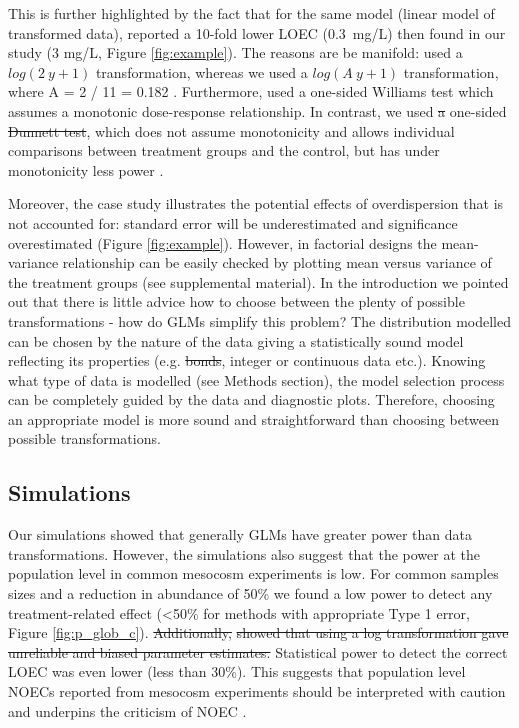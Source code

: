 \documentclass[twocolumn, natbib]{svjour3}
\providecommand{\DIFadd}[1]{{\protect\color{blue}\uwave{#1}}} %
\providecommand{\DIFdel}[1]{{\protect\color{red}\sout{#1}}}                      %
\providecommand{\DIFaddbegin}{} %
\providecommand{\DIFaddend}{} %
\providecommand{\DIFdelbegin}{} %
\providecommand{\DIFdelend}{} %
\begin{document}
\DIFaddend This is further highlighted by the fact that for the same model (linear model of transformed data), \citet{brock_minimum_2015} reported a 10-fold lower LOEC (\mbox{0.3 mg/L}) then found in our study (3 mg/L, Figure \ref{fig:example}).
The reasons are be manifold: \citep{brock_minimum_2015} used a $log(2~y + 1)$ transformation, whereas we used a $log(A~y + 1)$ transformation, where A = 2 / 11 = 0.182 \citep{van_den_brink_impact_2000}.
Furthermore, \citet{brock_minimum_2015} used a one-sided Williams test which assumes a monotonic dose-response relationship.
In contrast, we used \DIFdelbegin \DIFdel{a }\DIFdelend one-sided \DIFdelbegin \DIFdel{Dunnett test}\DIFdelend \DIFaddbegin \DIFadd{comparisons to the control (Dunnett contrasts)}\DIFaddend , which does not assume monotonicity and allows individual comparisons between treatment groups and the control, but has under monotonicity less power \citep{jaki_statistical_2013}.


Moreover, the case study illustrates the potential effects of overdispersion that is not accounted for: standard error will be underestimated and significance overestimated (Figure \ref{fig:example}).
However, in factorial designs the mean-variance relationship can be easily checked by plotting mean versus variance of the treatment groups (see supplemental material).
In the introduction we pointed out that there is little advice how to choose between the plenty of possible transformations - how do GLMs simplify this problem?
The distribution modelled can be chosen by the nature of the data giving a statistically sound model reflecting its properties (e.g. \DIFdelbegin \DIFdel{bonds}\DIFdelend \DIFaddbegin \DIFadd{bounds}\DIFaddend , integer or continuous data etc.).
Knowing what type of data is modelled (see Methods section), the model selection process can be completely guided by the data and diagnostic plots. Therefore, choosing an appropriate model is more sound and straightforward than choosing between possible transformations.


\subsection{Simulations}
Our simulations showed that generally GLMs have greater power than data transformations.
However, the simulations also suggest that the power at the population level in common mesocosm experiments is low.
For common samples sizes and a reduction in abundance of 50\% we found a low power to detect any treatment-related effect (\textless 50\% for methods with appropriate Type 1 error, Figure \ref{fig:p_glob_c}).
\DIFdelbegin \DIFdel{Additionally, }%
\DIFdel{showed that using a log transformation gave unreliable and biased parameter estimates.
}\DIFdelend Statistical power to detect the correct LOEC was even lower (less than 30\%).
This suggests that population level NOECs reported from mesocosm experiments should be interpreted with caution and underpins the criticism of NOEC \citep{laskowski_good_1995,landis_well_2011}.
\end{document}
